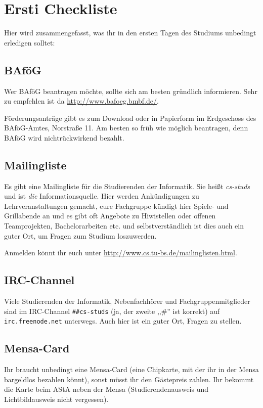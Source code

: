 
\section{Ersti Checkliste}

Hier wird zusammengefasst, was ihr in den ersten Tagen des Studiums
unbedingt erledigen solltet:

\subsection{BAf\"oG}

Wer BAf\"oG beantragen m\"ochte, sollte sich am besten gr\"undlich
informieren. Sehr zu empfehlen ist da \url{http://www.bafoeg.bmbf.de/}.

F\"orderungsantr\"age gibt es zum Download oder in Papierform im
Erdgeschoss des BAf\"oG-Amtes, Norstra\ss e 11. Am besten so fr\"uh
wie m\"oglich beantragen, denn BAf\"oG wird nichtr\"uckwirkend bezahlt.

\subsection{Mailingliste}

Es gibt eine Mailingliste f\"ur die Studierenden der Informatik.
Sie heißt \emph{cs-studs} und ist \emph{die} Informationsquelle.
Hier werden Ank\"undigungen zu Lehrveranstaltungen gemacht, eure
Fachgruppe k\"undigt hier Spiele- und Grillabende an und es gibt
oft Angebote zu Hiwistellen oder offenen Teamprojekten,
Bachelorarbeiten etc. und selbstverst\"andlich ist dies auch ein
guter Ort, um Fragen zum Studium loszuwerden.

Anmelden k\"onnt ihr euch unter
\url{http://www.cs.tu-bs.de/mailinglisten.html}.

\subsection{IRC-Channel}

Viele Studierenden der Informatik, Nebenfachh\"orer und
Fachgruppenmitglieder sind im IRC-Channel \texttt{\#\#cs-studs}
(ja, der zweite ,,\#'' ist korrekt) auf \texttt{irc.freenode.net}
unterwegs. Auch hier ist ein guter Ort, Fragen zu stellen.

\subsection{Mensa-Card}

Ihr braucht unbedingt eine Mensa-Card (eine Chipkarte,
mit der ihr in der Mensa bargeldlos bezahlen k\"onnt), sonst
m\"usst ihr den G\"astepreis zahlen. Ihr bekommt die Karte beim
AStA neben der Mensa (Studierendenausweis und Lichtbildausweis
nicht vergessen).

